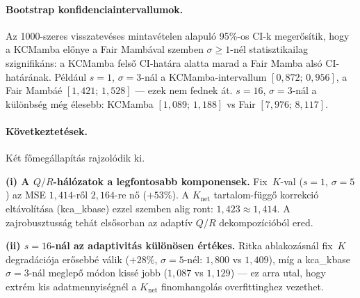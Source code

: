\paragraph{Bootstrap konfidenciaintervallumok.}
Az 1000-szeres visszatevéses mintavételen alapuló 95\%-os CI-k megerősítik,
hogy a KCMamba előnye a Fair Mambával szemben $\sigma{\geq}1$-nél
statisztikailag szignifikáns: a KCMamba felső CI-határa alatta marad a Fair
Mamba alsó CI-határának. Például $s{=}1$, $\sigma{=}3$-nál a KCMamba-intervallum
$[0{,}872;\,0{,}956]$, a Fair Mambáé $[1{,}421;\,1{,}528]$ --- ezek nem fednek
át. $s{=}16$, $\sigma{=}3$-nál a különbség még élesebb: KCMamba $[1{,}089;\,1{,}188]$
vs Fair $[7{,}976;\,8{,}117]$.

\paragraph{Következtetések.}
Két főmegállapítás rajzolódik ki.

\textbf{(i) A $Q/R$-hálózatok a legfontosabb komponensek.}
Fix~$K$-val ($s{=}1$, $\sigma{=}5$) az MSE $1{,}414$-ről $2{,}164$-re nő
($+53\%$). A $K_\text{net}$ tartalom-függő korrekció eltávolítása
(kca\_kbase) ezzel szemben alig ront: $1{,}423 \approx 1{,}414$.
A zajrobusztusság tehát elsősorban az adaptív $Q/R$ dekompozícióból ered.

\textbf{(ii) $s{=}16$-nál az adaptivitás különösen értékes.}
Ritka ablakozásnál fix~$K$ degradációja erősebbé válik
($+28\%$, $\sigma{=}5$-nél: $1{,}800$ vs $1{,}409$), míg a kca\_kbase
$\sigma{=}3$-nál meglepő módon kissé jobb ($1{,}087$ vs $1{,}129$) ---
ez arra utal, hogy extrém kis adatmennyiségnél a $K_\text{net}$
finomhangolás overfittinghez vezethet.
